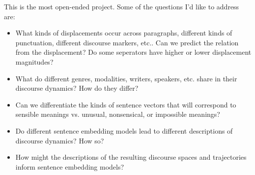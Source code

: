 \documentclass{article}
\begin{document}
   This is the most open-ended project.
   Some of the questions I'd like to address are:
   \begin{itemize}
      \item{What kinds of displacements occur across paragraphs, different kinds of punctuation, different discourse markers, etc..
      Can we predict the relation from the displacement?
      Do some seperators have higher or lower displacement magnitudes?}
      \item{What do different genres, modalities, writers, speakers, etc. share in their discourse dynamics? How do they differ?}
      \item{Can we differentiate the kinds of sentence vectors that will correspond to sensible meanings vs. unusual, nonsensical, or impossible meanings?}
      \item{Do different sentence embedding models lead to different descriptions of discourse dynamics? How so?}
      \item{How might the descriptions of the resulting discourse spaces and trajectories inform sentence embedding models?}
   \end{itemize}

   
   
\end{document}
